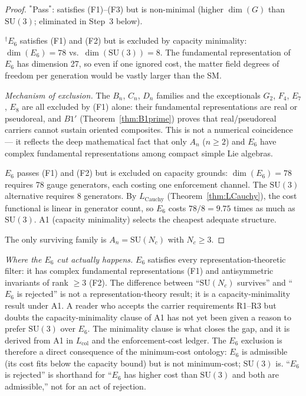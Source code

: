 \documentclass[11pt,a4paper]{article}
\theoremstyle{definition}
\newcommand{\SU}{\mathrm{SU}}
\begin{document}
\begin{proof}
\smallskip\noindent ${}^*$Pass$^*$: satisfies (F1)--(F3) but is
non-minimal (higher $\dim(G)$ than $\SU(3)$; eliminated in Step~3
below).

\smallskip\noindent ${}^\dagger$$E_6$ satisfies (F1) and (F2) but is
excluded by capacity minimality: $\dim(E_6) = 78$ vs.\
$\dim(\SU(3)) = 8$.  The fundamental representation of $E_6$ has
dimension 27, so even if one ignored cost, the matter field
degrees of freedom per generation would be vastly larger than the SM.

\medskip\noindent\textit{Mechanism of exclusion.}\quad
The $B_n$, $C_n$, $D_n$ families and the exceptionals $G_2$, $F_4$,
$E_7$, $E_8$ are all excluded by (F1) alone: their fundamental
representations are real or pseudoreal, and $B1'$
(Theorem~\ref{thm:B1prime}) proves that real/pseudoreal carriers
cannot sustain oriented composites.  This is not a numerical
coincidence --- it reflects the deep mathematical fact that only $A_n$
($n \ge 2$) and $E_6$ have complex fundamental representations among
compact simple Lie algebras.

$E_6$ passes (F1) and (F2) but is excluded on capacity grounds:
$\dim(E_6) = 78$ requires 78 gauge generators, each costing one
enforcement channel.  The $\SU(3)$ alternative requires 8 generators.
By $L_{\mathrm{Cauchy}}$ (Theorem~\ref{thm:LCauchy}), the cost
functional is linear in generator count, so $E_6$ costs
$78/8 = 9.75$ times as much as $\SU(3)$.  A1 (capacity minimality)
selects the cheapest adequate structure.

The only surviving family is $A_n = \SU(N_c)$ with $N_c \ge 3$.
\end{proof}

\smallskip\noindent\textit{Where the $E_6$ cut actually happens.}\quad
$E_6$ satisfies every representation-theoretic filter: it has complex
fundamental representations (F1) and antisymmetric invariants of rank
$\ge 3$ (F2).  The difference between ``$\SU(N_c)$ survives'' and
``$E_6$ is rejected'' is not a representation-theory result; it is a
capacity-minimality result under A1.  A reader who accepts the carrier
requirements R1--R3 but doubts the capacity-minimality clause of A1
has not yet been given a reason to prefer $\SU(3)$ over $E_6$.  The
minimality clause is what closes the gap, and it is derived from A1
in $L_{\mathrm{col}}$ and the enforcement-cost ledger.  The $E_6$
exclusion is therefore a direct consequence of the minimum-cost
ontology: $E_6$ is admissible (its cost fits below the capacity bound)
but is not minimum-cost; $\SU(3)$ is.  ``$E_6$ is rejected'' is
shorthand for ``$E_6$ has higher cost than $\SU(3)$ and both are
admissible,'' not for an act of rejection.
\end{document}
